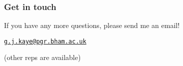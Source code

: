 \documentclass[aspectratio=169]{beamer}
\begin{document}
\begin{frame}
    \frametitle{Get in touch}
    \centering

    \Large

    If you have any more questions, please send me an email!
    \vspace{0.25em}

    \HUGE
    \href{mailto:g.j.kaye@pgr.bham.ac.uk}{\texttt{g.j.kaye@pgr.bham.ac.uk}}

    \Large
    \vspace{1em}

    (other reps are available)
\end{frame}
\end{document}
